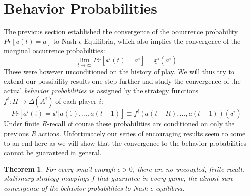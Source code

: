 \documentclass[a4paper]{article}
\theoremstyle{plain}
\newtheorem{theorem}{Theorem}
\theoremstyle{remark}
\newcommand{\eq}[1]{\underline{#1}}
\begin{document}

\section{Behavior Probabilities}

The previous section established the convergence of the occurrence probability $Pr[a(t) = a]$ to
Nash $\epsilon$-Equilibria, which also implies the convergence of the marginal occurrence probabilities:
\[
	\lim_{t \to \infty} Pr[a^i(t) = a^i] = \eq{x}^i(a^i)
\]
These were however unconditioned on the history of play. We will thus try to extend our possibility results
one step further and 
study the convergence of the actual \emph{behavior probabilities}
as assigned by the strategy functions $f^i : H \to \Delta(A^i)$ of each player $i$:
 \[
 	Pr[a^i(t) = a^i | a(1), ..., a(t-1) ] \equiv f^i(a(t - R), ..., a(t-1))(a^i)
\]
Under finite $R$-recall of course these probabilities are conditioned on only the previous $R$ actions.
Unfortunately our series of encouraging results seem to come to an end here as we will show that
the convergence to the behavior probabilities cannot be guaranteed in general.

\begin{theorem}
	For every small enough $\epsilon > 0$, there are no uncoupled, finite recall, stationary strategy
	mappings $f$ that guarantee in every game, the almost sure convergence of the behavior probabilities
	to Nash $\epsilon$-equilibria.
\end{theorem}
\end{document}
